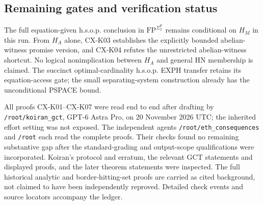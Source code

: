 \subsection{Remaining gates and verification status}

The full equation-given h.s.o.p. conclusion in
$\mathrm{FP}^{\Sigma_2^{\mathrm P}}$ remains conditional on $H_M$
in this run. From $H_A$ alone, CX-K03 establishes the explicitly
bounded abelian-witness promise version, and CX-K04 refutes the
unrestricted abelian-witness shortcut. No logical nonimplication
between $H_A$ and general HN membership is claimed. The succinct
optimal-cardinality h.s.o.p. EXPH transfer retains its equation-access
gate; the small separating-system construction already has the
unconditional PSPACE bound.

All proofs CX-K01--CX-K07 were read end to end after drafting by
\texttt{/root/koiran\_gct}, GPT-6 Astra Pro, on 20 November 2026 UTC;
the inherited effort setting was not exposed. The independent agents
\texttt{/root/eth\_consequences} and \texttt{/root} each read the
complete proofs. Their checks found no remaining substantive gap after
the standard-grading and output-scope qualifications were incorporated.
Koiran's protocol and erratum, the relevant GCT statements and displayed
proofs, and the later theorem statements were inspected. The full
historical analytic and border-hitting-set proofs are carried as cited
background, not claimed to have been independently reproved. Detailed
check events and source locators accompany the ledger.

